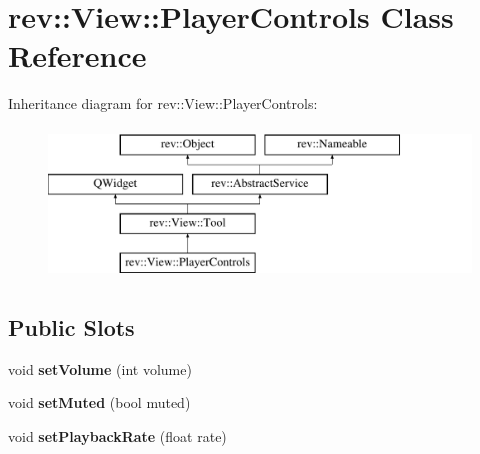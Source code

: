 \hypertarget{classrev_1_1_view_1_1_player_controls}{}\section{rev\+::View\+::Player\+Controls Class Reference}
\label{classrev_1_1_view_1_1_player_controls}
Inheritance diagram for rev\+::View\+::Player\+Controls\+:\begin{figure}[H]
\begin{center}
\leavevmode
\includegraphics[height=4.000000cm]{classrev_1_1_view_1_1_player_controls}
\end{center}
\end{figure}
\subsection*{Public Slots}
\begin{DoxyCompactItemize}
\item 
\mbox{\label{classrev_1_1_view_1_1_player_controls_a0af1d19fa32621c35658887cadc44c4e}} 
void {\bfseries set\+Volume} (int volume)
\item 
\mbox{\label{classrev_1_1_view_1_1_player_controls_a2da684a545965ab28c5cff44168e653b}} 
void {\bfseries set\+Muted} (bool muted)
\item 
\mbox{\label{classrev_1_1_view_1_1_player_controls_a57c728d788d91802ac94d5a1cb71e272}} 
void {\bfseries set\+Playback\+Rate} (float rate)
\end{DoxyCompactItemize}
